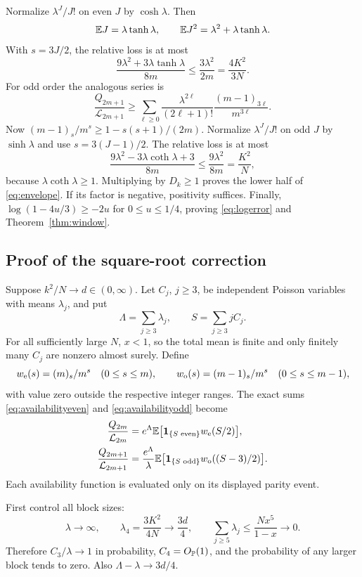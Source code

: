 Normalize $\lambda^J/J!$ on even $J$ by $\cosh\lambda$. Then
\[
\mathbb E J=\lambda\tanh\lambda,\qquad
\mathbb E J^2=\lambda^2+\lambda\tanh\lambda.
\]
With $s=3J/2$, the relative loss is at most
\[
\frac{9\lambda^2+3\lambda\tanh\lambda}{8m}
\le\frac{3\lambda^2}{2m}=\frac{4K^2}{3N}.
\]
For odd order the analogous series is
\[
\frac{Q_{2m+1}}{\mathcal L_{2m+1}}
\ge\sum_{\ell\ge0}\frac{\lambda^{2\ell}}{(2\ell+1)!}
\frac{(m-1)_{3\ell}}{m^{3\ell}}.
\]
Now $(m-1)_s/m^s\ge1-s(s+1)/(2m)$. Normalize $\lambda^J/J!$ on odd $J$ by $\sinh\lambda$ and use $s=3(J-1)/2$. The relative loss is at most
\[
\frac{9\lambda^2-3\lambda\coth\lambda+3}{8m}
\le\frac{9\lambda^2}{8m}=\frac{K^2}N,
\]
because $\lambda\coth\lambda\ge1$. Multiplying by $D_k\ge1$ proves the lower half of \eqref{eq:envelope}. If its factor is negative, positivity suffices. Finally, $\log(1-4u/3)\ge-2u$ for $0\le u\le1/4$, proving \eqref{eq:logerror} and Theorem~\ref{thm:window}.

\subsection{Proof of the square-root correction}

Suppose $k^2/N\to d\in(0,\infty)$. Let $C_j$, $j\ge3$, be independent Poisson variables with means $\lambda_j$, and put
\[
\Lambda=\sum_{j\ge3}\lambda_j,\qquad S=\sum_{j\ge3}jC_j.
\]
For all sufficiently large $N$, $x<1$, so the total mean is finite and only finitely many $C_j$ are nonzero almost surely. Define
\[
w_{\rm e}(s)=(m)_s/m^s\quad(0\le s\le m),\qquad
w_{\rm o}(s)=(m-1)_s/m^s\quad(0\le s\le m-1),
\]
with value zero outside the respective integer ranges. The exact sums \eqref{eq:availabilityeven} and \eqref{eq:availabilityodd} become
\begin{align}
\frac{Q_{2m}}{\mathcal L_{2m}}
&=e^\Lambda\mathbb E\bigl[\mathbf 1_{\{S\text{ even}\}}w_{\rm e}(S/2)\bigr],\label{eq:poissoneven}\\
\frac{Q_{2m+1}}{\mathcal L_{2m+1}}
&=\frac{e^\Lambda}{\lambda}\mathbb E\bigl[\mathbf 1_{\{S\text{ odd}\}}w_{\rm o}((S-3)/2)\bigr].\label{eq:poissonodd}
\end{align}
Each availability function is evaluated only on its displayed parity event.

First control all block sizes:
\[
\lambda\to\infty,\qquad
\lambda_4=\frac{3K^2}{4N}\to\frac{3d}4,\qquad
\sum_{j\ge5}\lambda_j\le\frac{Nx^5}{1-x}\to0.
\]
Therefore $C_3/\lambda\to1$ in probability, $C_4=O_{\mathbb P}(1)$, and the probability of any larger block tends to zero. Also $\Lambda-\lambda\to3d/4$.

